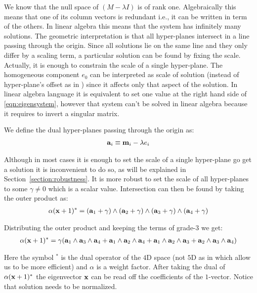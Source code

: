 \documentclass{birkjour}
\numberwithin{equation}{section}
\begin{document}
We know that the null space of $(M - \lambda I)$ is of rank one. Algebraically this means that one of its column vectors is redundant i.e., it can be written in term of the others. In linear algebra this means that the system has infinitely many solutions. The geometric interpretation is that all hyper-planes intersect in a line passing through the origin. Since all solutions lie on the same line and they only differ by a scaling term, a particular solution can be found by fixing the scale. Actually, it is enough to constrain the scale of a single hyper-plane. The homogeneous component $e_0$ can be interpreted as scale of solution (instead of hyper-plane's offset as in \cite{DeKeninck2019}) since it affects only that aspect of the solution. In linear algebra language it is equivalent to set one value at the right hand side of \ref{eqn:eigensystem}, however that system can't be solved in linear algebra because it requires to invert a singular matrix.

We define the dual hyper-planes passing through the origin as:
\begin{eqnarray}
   \textbf a_i \equiv \textbf m_i - \lambda e_i
\end{eqnarray}

Although in most cases it is enough to set the scale of a single hyper-plane go get a solution it is inconvenient to do so, as will be explained in Section~\ref{section:robustness}. It is more robust to set the scale of all hyper-planes to some $\gamma \neq 0$ which is a scalar value. Intersection can then be found by taking the outer product as:
\begin{eqnarray}
\label{eqn:hyperplanes_intersection}
\alpha (\textbf x + 1)^* = (\textbf a_1 + \gamma) \wedge  (\textbf a_2 + \gamma) \wedge  (\textbf a_3  + \gamma) \wedge (\textbf a_4 + \gamma)
\end{eqnarray}

Distributing the outer product and keeping the terms of grade-$3$ we get:
\begin{eqnarray}
\alpha (\textbf x + 1)^* =  \gamma (\textbf a_1 \wedge \textbf a_3 \wedge \textbf a_4
+ \textbf a_1 \wedge \textbf a_2 \wedge \textbf a_4
+ \textbf a_1 \wedge \textbf a_2 \wedge \textbf a_3
+ \textbf a_2 \wedge \textbf a_3 \wedge \textbf a_4)
\end{eqnarray}

Here the symbol $^*$ is the dual operator of the $4$D space (not $5$D as in \cite{DeKeninck2019} which allow us to be more efficient) and $\alpha$ is a weight factor. After taking the dual of $\alpha (\textbf x + 1)^*$ the eigenvector $\textbf x$ can be read off the coefficients of the $1$-vector. Notice that solution needs to be normalized.
\end{document}
